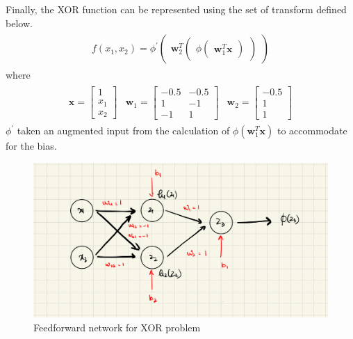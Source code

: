 Finally, the XOR function can be represented using the set of transform defined below.
\begin{align}
  \begin{matrix}
    f(x_1,x_2) = \phi^{'} \begin{pmatrix}
    \textbf{w}_2^T 
    \begin{pmatrix}
      \phi \begin{pmatrix}
        \textbf{w}_1^T\textbf{x}
    \end{pmatrix}  
  \end{pmatrix}
  \end{pmatrix}
\end{matrix}
\end{align}
where
\begin{align}
  \begin{matrix}
  \textbf{x} = \begin{bmatrix}
    1 \\
    x_1 \\
    x_2
  \end{bmatrix} & \textbf{w}_1 = \begin{bmatrix}
    -0.5 & -0.5 \\
    1 & -1  \\
    -1 & 1 
  \end{bmatrix} & \textbf{w}_2 = \begin{bmatrix}
    -0.5 \\
    1 \\
    1
  \end{bmatrix} 
  \end{matrix}
\end{align}
$\phi^{'}$ taken an augmented input from the calculation of $\phi(\textbf{w}_1^T \textbf{x})$ to accommodate for the bias.
\begin{figure}[ht]
  \centering
  \includegraphics[scale=0.15]{CHAPTER_2/c2_fig_XOR_final.jpeg}
  \caption{Feedforward network for XOR problem}
  \label{fig: ffn_XOR_final}
\end{figure}\vspace{30mm}\\
